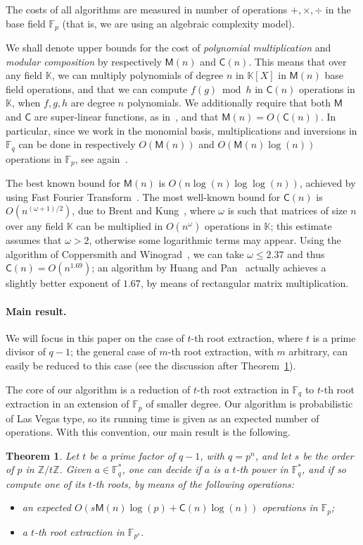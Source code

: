 \documentclass[12pt]{article}
\theoremstyle{plain}
\newtheorem{theorem}{Theorem}
\theoremstyle{definition}
\def\F{\mathbb{F}}
\def\K{\mathbb{K}}
\def\M{\mathsf{M}}
\def\CC{\mathsf{C}}
\newcounter{algorithm}
\begin{document}
The costs of all algorithms are measured in number of operations
$+,\times,\div$ in the base field $\F_p$ (that is, we are using an
algebraic complexity model).

We shall denote upper bounds for the cost of {\em polynomial
  multiplication} and {\em modular composition} by respectively
$\M(n)$ and $\CC(n)$. This means that over any field $\K$, we can
multiply polynomials of degree $n$ in $\K[X]$ in $\M(n)$ base field
operations, and that we can compute $f(g) \bmod h$ in $\CC(n)$
operations in $\K$, when $f,g,h$ are degree $n$ polynomials. We
additionally require that both $\M$ and $\CC$ are super-linear
functions, as in~\cite[Chapter~8]{GaGe03}, and that $\M(n)=O(\CC(n))$.
In particular, since we work in the monomial basis, multiplications
and inversions in $\F_q$ can be done in respectively $O(\M(n))$ and
$O(\M(n)\log(n))$ operations in $\F_p$, see again~\cite{GaGe03}.

The best known bound for $\M(n)$ is $O(n\log(n)\log\log(n))$, achieved
by using Fast Fourier Transform~\cite{Schonhage1971,CaKa91}.  The most
well-known bound for $\CC(n)$ is $O(n^{(\omega+1)/2})$, due to Brent
and Kung~\cite{BrKu78}, where $\omega$ is such that matrices of size
$n$ over any field $\K$ can be multiplied in $O(n^\omega)$ operations
in $\K$; this estimate assumes that $\omega > 2$, otherwise some
logarithmic terms may appear. Using the algorithm of Coppersmith and
Winograd~\cite{CoWi90}, we can take $\omega \le 2.37$ and thus
$\CC(n)=O(n^{1.69})$; an algorithm by Huang and Pan~\cite{HuPa98}
actually achieves a slightly better exponent of $1.67$, by means of
rectangular matrix multiplication.

\paragraph{Main result.}
We will focus in this paper on the case of $t$-th root extraction,
where $t$ is a prime divisor of $q-1$; the general case of $m$-th root
extraction, with $m$ arbitrary, can easily be reduced to this case
(see the discussion after Theorem~\ref{theo:main}).

The core of our algorithm is a reduction of $t$-th root extraction in
$\F_q$ to $t$-th root extraction in an extension of $\F_p$ of smaller
degree. Our algorithm is probabilistic of Las Vegas type, so 
its running time is given as an expected number of operations. With
this convention, our main result is the following.

\begin{theorem}\label{theo:main}
  Let $t$ be a prime factor of $q-1$, with $q=p^n$, and let $s$ be the
  order of $p$ in $\mathbb{Z}/t\mathbb{Z}$. Given $a\in \F_q^*$, one
  can decide if $a$ is a $t$-th power in $\F_q^*$, and if so compute
  one of its $t$-th roots, by means of the following operations:
  \begin{itemize}
  \item an expected $O(s\M(n)\log(p) + \CC(n)\log(n))$ operations in
    $\F_p$;
  \item a $t$-th root extraction in $\F_{p^s}$.
  \end{itemize}
\end{theorem}
\end{document}
